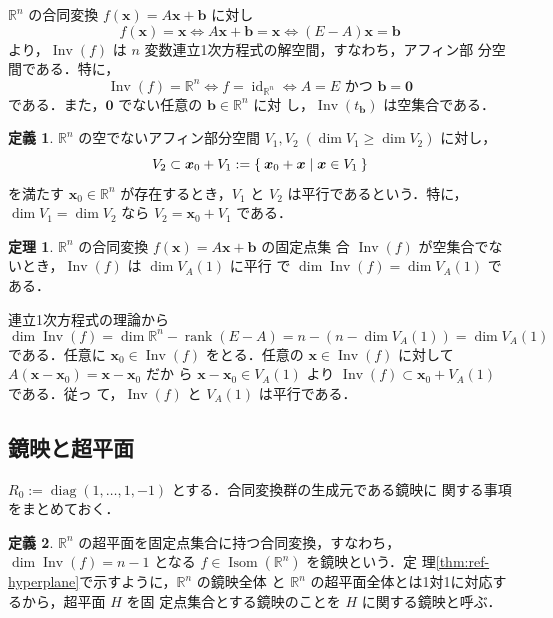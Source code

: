 \documentclass[11pt, uplatex, dvipdfmx, titlepage]{jsarticle}
\makeatletter
\DeclareMathOperator{\Isom}{Isom}
\DeclareMathOperator{\Inv}{Inv}
\DeclareMathOperator{\id}{id}
\DeclareMathOperator{\rank}{rank}
\DeclareMathOperator{\diag}{diag}
\renewenvironment{proof}[1][\proofname]{\par
  \pushQED{\qed}%
  \normalfont \topsep6\p@\@plus6\p@\relax
  \trivlist
  \item[\hskip\labelsep
         \bfseries
    {#1}]\ignorespaces
}{%
  \popQED\endtrivlist\@endpefalse
}
\theoremstyle{definition}
\newtheorem{theorem}{定理}[section]
\newtheorem*{definition}{定義}
\renewcommand{\proofname}{\textbf{証明}}
\makeatother
\begin{document}
$\mathbb{R}^n$ の合同変換 $f(\bm{x}) = A\bm{x}+\bm{b}$ に対し
\[
  f(\bm{x}) = \bm{x} \Leftrightarrow A\bm{x}+\bm{b} = \bm{x} \Leftrightarrow (E-A)\bm{x} = \bm{b}
\]
より，$\Inv(f)$ は $n$ 変数連立1次方程式の解空間，すなわち，アフィン部
分空間である．特に，
\[
  \Inv(f) = \mathbb{R}^n \Leftrightarrow f = \id_{\mathbb{R}^n} \Leftrightarrow 
  A=E \text{ かつ }\bm{b}=\bm{0}
\]
である．また，$\bm{0}$ でない任意の $\bm{b} \in \mathbb{R}^n$ に対
し，$\Inv \left (t_{\bm{b}} \right)$ は空集合である．

\begin{definition}
  $\mathbb{R}^n$ の空でないアフィン部分空間 $V_1, V_2 \; (\dim V_1 \geq \dim V_2)$ に対し，
  \[
    V_2 \subset \bm{x}_0 + V_1 := \Set{ \bm{x}_0 + \bm{x} | \bm{x} \in V_1}
  \]
  を満たす $\bm{x}_0 \in \mathbb{R}^n$ が存在するとき，$V_1$ と $V_2$
  は平行であるという．特に，$\dim V_1 = \dim V_2$ なら $V_2 = \bm{x}_0
  +V_1$ である．
\end{definition}


\begin{theorem}\label{thm:diminv}
  $\mathbb{R}^n$ の合同変換 $f(\bm{x}) = A\bm{x} + \bm{b}$ の固定点集
  合 $\Inv(f)$ が空集合でないとき，$\Inv(f)$ は $\dim V_A(1)$ に平行
  で $\dim \Inv(f) = \dim V_A(1)$ である．
\end{theorem}

\begin{proof}
  連立1次方程式の理論から
  \[
    \dim \Inv(f) = \dim \mathbb{R}^n  - \rank(E-A) = n - \left( n - \dim V_A(1)\right) = \dim V_A(1)
  \]
  である．任意に $\bm{x}_0 \in \Inv(f)$ をとる．任意の $\bm{x} \in
  \Inv(f)$ に対して $A(\bm{x} - \bm{x}_0) = \bm{x} -\bm{x}_0$ だか
  ら $\bm{x} - \bm{x}_0 \in V_A(1)$ より
  $\Inv(f) \subset \bm{x}_0 + V_A(1)$ である．従っ
  て，$\Inv(f)$ と $V_A(1)$ は平行である．
\end{proof}

\subsection{鏡映と超平面}\label{sec:reflection}

$R_0 := \diag(1, \ldots, 1, -1)$ とする．合同変換群の生成元である鏡映に
関する事項をまとめておく．

\begin{definition}
  $\mathbb{R}^n$ の超平面を固定点集合に持つ合同変換，すなわち，$\dim
  \Inv(f)=n-1$ となる $f \in \Isom(\mathbb{R}^n)$ を鏡映という．定
  理\ref{thm:ref-hyperplane}で示すように，$\mathbb{R}^n$ の鏡映全体
  と $\mathbb{R}^n$ の超平面全体とは1対1に対応するから，超平面 $H$ を固
  定点集合とする鏡映のことを $H$ に関する鏡映と呼ぶ．

\end{definition}
\end{document}

